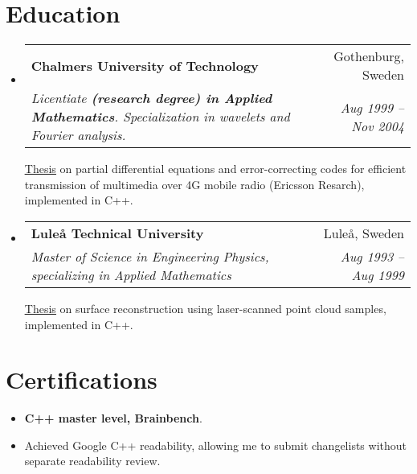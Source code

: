 \documentclass[a4paper,11pt]{article}
\makeatletter
\newcommand{\resumeItem}[1]{
  \item\small{#1}
}
\newcommand{\resumeItemListStart}{\begin{itemize}[rightmargin=0.11in]}
\newcommand{\resumeItemListEnd}{\end{itemize}}
\newcommand{\resumeQuadHeading}[4]{
  \item
  \begin{tabular*}{0.96\textwidth}[t]{l@{\extracolsep{\fill}}r}
    \textbf{#1} & #2 \\
    \textit{\small#3} & \textit{\small #4} \\
  \end{tabular*}
}
\newcommand{\resumeHeadingListStart}{
  \begin{itemize}[leftmargin=0.15in, label={}]
}
\newcommand{\resumeHeadingListEnd}{\end{itemize}}
\makeatother
\begin{document}

\section{Education}
  \resumeHeadingListStart{} \resumeQuadHeading{Chalmers University of
    Technology}{Gothenburg, Sweden}{Licentiate \textbf{(research degree) in
      Applied Mathematics}. Specialization in wavelets and Fourier
    analysis.}{Aug 1999 -- Nov 2004}

    \href{https://research.chalmers.se/en/publication/94396}{\uline{Thesis}} on
    partial differential equations and error-correcting codes for efficient
    transmission of multimedia over 4G mobile radio (Ericsson Resarch),
    implemented in C++.

    \resumeQuadHeading{Luleå Technical University}{Luleå, Sweden} {Master of
      Science in Engineering Physics, specializing in Applied Mathematics}{Aug
      1993 -- Aug 1999}

    \href{https://ltu.diva-portal.org/smash/get/diva2:1032007/FULLTEXT01.pdf}
         {\uline{Thesis}} on surface reconstruction using laser-scanned point
         cloud samples, implemented in C++.  \resumeHeadingListEnd{}







\section{Certifications}
\resumeItemListStart{}


  \resumeItem{\textbf{C++ master level, Brainbench}.}

  \resumeItem{Achieved Google C++ readability, allowing me to submit
    changelists without separate readability review.}

  \resumeItemListEnd{}
\end{document}
